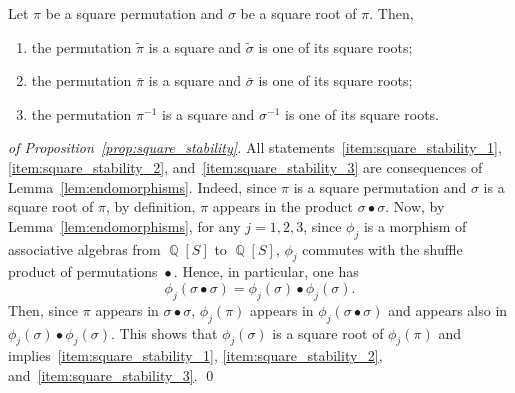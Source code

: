 \documentclass[a4paper]{llncs}
\DeclareMathOperator{\QQ}{\mathbb{Q}}
\DeclareMathOperator{\SHUFFLE}{\bullet}
\begin{document}
\begin{proposition} \label{prop:square_stability}
    Let $\pi$ be a square permutation and $\sigma$ be a square root of
    $\pi$. Then,
    \begin{enumerate}[label={\it (\roman*)},fullwidth]
        \item \label{item:square_stability_1}
        the permutation $\widetilde{\pi}$ is a square and
        $\widetilde{\sigma}$ is one of its square roots;
        \item \label{item:square_stability_2}
        the permutation $\bar \pi$ is a square and $\bar \sigma$ is one of
        its square roots;
        \item \label{item:square_stability_3}
        the permutation $\pi^{-1}$ is a square and $\sigma^{-1}$ is one of
        its square roots.
    \end{enumerate}
\end{proposition}
\begin{proof}[of Proposition~\ref{prop:square_stability}]
    All statements~\ref{item:square_stability_1},
    \ref{item:square_stability_2}, and~\ref{item:square_stability_3} are
    consequences of Lemma~\ref{lem:endomorphisms}. Indeed,
    since $\pi$ is a square permutation and $\sigma$ is a square root of
    $\pi$, by definition, $\pi$ appears in the product
    $\sigma \SHUFFLE \sigma$. Now, by Lemma~\ref{lem:endomorphisms},
    for any $j = 1, 2, 3$, since $\phi_j$ is a morphism of associative
    algebras from $\QQ[S]$ to $\QQ[S]$, $\phi_j$ commutes with the
    shuffle product of permutations $\SHUFFLE$. Hence, in particular,
    one has
    \begin{equation}
        \phi_j(\sigma \SHUFFLE \sigma) =
        \phi_j(\sigma) \SHUFFLE \phi_j(\sigma).
    \end{equation}
    Then, since $\pi$ appears in $\sigma \SHUFFLE \sigma$, $\phi_j(\pi)$
    appears in $\phi_j(\sigma \SHUFFLE \sigma)$ and appears also in
    $\phi_j(\sigma) \SHUFFLE \phi_j(\sigma)$. This shows that
    $\phi_j(\sigma)$ is a square root of $\phi_j(\pi)$ and
    implies~\ref{item:square_stability_1}, \ref{item:square_stability_2},
    and~\ref{item:square_stability_3}.
    \qed
\end{proof}
\medskip
\end{document}
